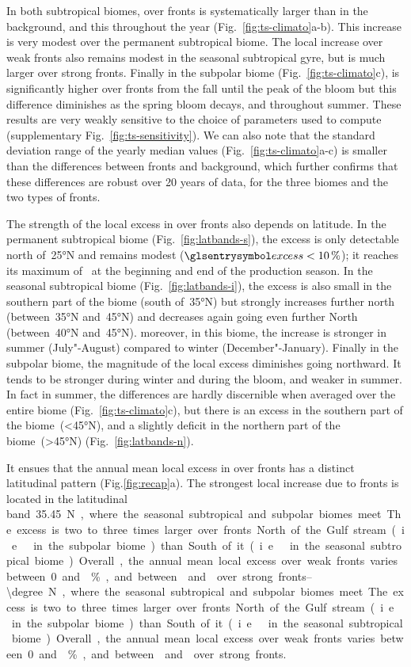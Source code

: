 In both subtropical biomes,  over fronts is systematically larger than in the background, and this throughout the year (Fig.~\ref{fig:ts-climato}a-b).
This increase is very modest over the permanent subtropical biome.
The local increase over weak fronts also remains modest in the seasonal subtropical gyre, but is much larger over strong fronts.
Finally in the subpolar biome (Fig.~\ref{fig:ts-climato}c),  is significantly higher over fronts from the fall until the peak of the bloom but this difference diminishes as the spring bloom decays, and throughout summer.
These results are very weakly sensitive to the choice of parameters used to compute  (supplementary Fig.~\ref{fig:ts-sensitivity}).
We can also note that the standard deviation range of the yearly median values (Fig.~\ref{fig:ts-climato}a-c) is smaller than the differences between fronts and background, which further confirms that these differences are robust over 20 years of data, for the three biomes and the two types of fronts.

The strength of the local excess in  over fronts also depends on latitude.
In the permanent subtropical biome (Fig.~\ref{fig:latbands-s}), the excess is only detectable north of~\ang{25}N and remains modest (\(\am{excess}<\pct{10}\)); it reaches its maximum of~ at the beginning and end of the production season.
In the seasonal subtropical biome (Fig.~\ref{fig:latbands-i}), the excess is also small in the southern part of the biome (south of~\ang{35}N) but strongly increases further north (between~\ang{35}N and~\ang{45}N) and decreases again going even further North (between~\ang{40}N and~\ang{45}N).
moreover, in this biome, the increase is stronger in summer (July"-August) compared to winter (December"-January).
Finally in the subpolar biome, the magnitude of the local excess diminishes going northward.
It tends to be stronger during winter and during the bloom, and weaker in summer.
In fact in summer, the differences are hardly discernible when averaged over the entire biome (Fig.~\ref{fig:ts-climato}c), but there is an excess  in the southern part of the biome~(\ang{<45}N), and a slightly deficit in the northern part of the biome~(\ang{>45}N) (Fig.~\ref{fig:latbands-n}).

It ensues that the annual mean local excess in  over fronts has a distinct latitudinal pattern (Fig.\ref{fig:recap}a).
The strongest local increase due to fronts is located in the latitudinal band~\qtyrange[range-phrase=--]{35,45}{\degree}N, where the seasonal subtropical and subpolar biomes meet.
The excess is two to three times larger over fronts North of the Gulf stream (i.e.\ in the subpolar biome) than South of it (i.e.\ in the seasonal subtropical biome).
Overall, the annual mean local excess over weak fronts varies between 0 and~\%, and between~ and~ over strong fronts.



